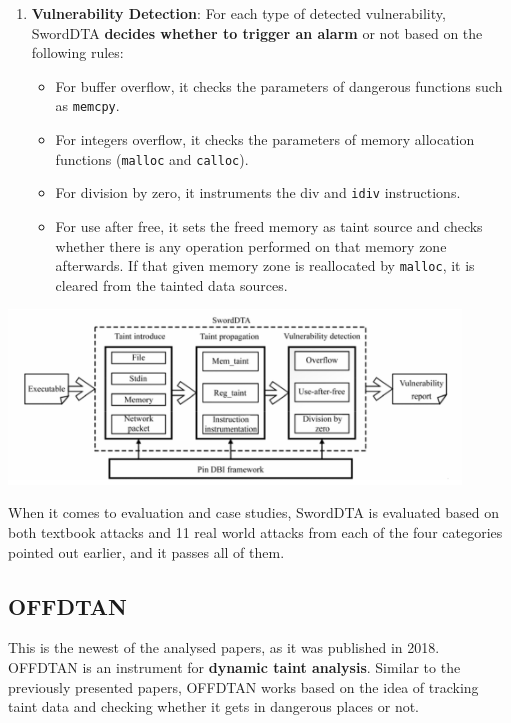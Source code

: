 \documentclass[10pt,a4paper,english,onecolumn]{IEEEtran}
\begin{document}
\begin{enumerate}
\begin{itemize}
        \end{itemize}
    \item \textbf{Vulnerability Detection}: For each type of detected vulnerability, SwordDTA \textbf{decides whether to trigger an alarm} or not based on the following rules:
        \begin{itemize}
            \item For buffer overflow, it checks the parameters of dangerous functions such as \texttt{memcpy}.
            \item For integers overflow, it checks the parameters of memory allocation functions (\texttt{malloc} and \texttt{calloc}).
            \item For division by zero, it instruments the div and \texttt{idiv} instructions.
            \item For use after free, it sets the freed memory as taint source and checks whether there is any operation performed on that memory zone afterwards. If that given memory zone is reallocated by \texttt{malloc}, it is cleared from the tainted data sources.
        \end{itemize}
\end{enumerate}

\begin{center}
    \includegraphics[width=12cm]{images/sworddta.png}
    \vspace{0.5cm}
\end{center}

When it comes to evaluation and case studies, SwordDTA is evaluated based on both textbook attacks and 11 real world attacks from each of the four categories pointed out earlier, and it passes all of them.

\subsection{OFFDTAN}

This is the newest of the analysed papers, as it was published in 2018. OFFDTAN is an instrument for \textbf{dynamic taint analysis}. Similar to the previously presented papers, OFFDTAN works based on the idea of tracking taint data and checking whether it gets in dangerous places or not.
\end{document}
